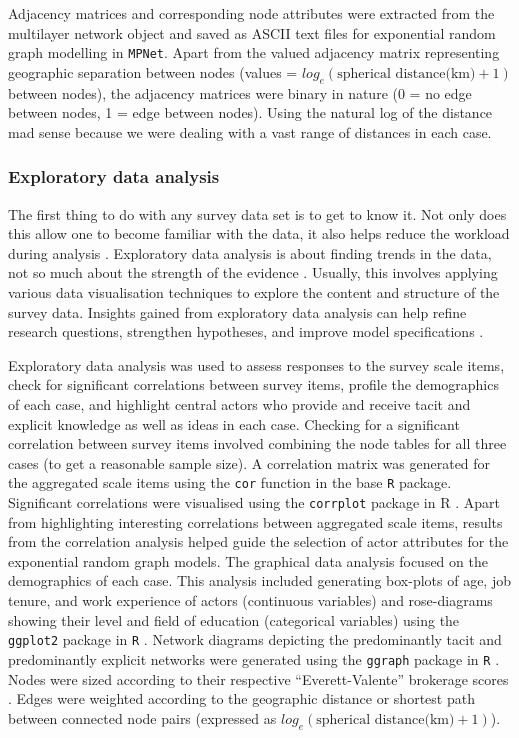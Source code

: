 Adjacency matrices and corresponding node attributes were extracted from the multilayer network object and saved as ASCII text files for exponential random graph modelling in \texttt{MPNet}. Apart from the valued adjacency matrix representing geographic separation between nodes (values = $log_e(\text{spherical distance(km)} + 1)$ between nodes), the adjacency matrices were binary in nature (0 = no edge between nodes, 1 = edge between nodes). Using the natural log of the distance mad sense because we were dealing with a vast range of distances in each case. 

\subsubsection{Exploratory data analysis}

The first thing to do with any survey data set is to get to know it. Not only does this allow one to become familiar with the data, it also helps reduce the workload during analysis \citep{cox2017translating}. Exploratory data analysis is about finding trends in the data, not so much about the strength of the evidence \citep{morgenthaler2009exploratory}. Usually, this involves applying various data visualisation techniques to explore the content and structure of the survey data. Insights gained from exploratory data analysis can help refine research questions, strengthen hypotheses, and improve model specifications \citep{jebb2017exploratory}. \medskip

Exploratory data analysis was used to assess responses to the survey scale items, check for significant correlations between survey items, profile the demographics of each case, and highlight central actors who provide and receive tacit and explicit knowledge as well as ideas in each case. Checking for a significant correlation between survey items involved combining the node tables for all three cases (to get a reasonable sample size). A correlation matrix was generated for the aggregated scale items using the \texttt{cor} function in the base \texttt{R} package. Significant correlations were visualised using the \texttt{corrplot} package in R \citep{wei2017corrplot}. Apart from highlighting interesting correlations between aggregated scale items, results from the correlation analysis helped guide the selection of actor attributes for the exponential random graph models. The graphical data analysis focused on the demographics of each case. This analysis included generating box-plots of age, job tenure, and work experience of actors (continuous variables) and rose-diagrams showing their level and field of education (categorical variables) using the \texttt{ggplot2} package in \texttt{R} \citep{wickham2016ggplot2}. Network diagrams depicting the predominantly tacit and predominantly explicit networks were generated using the \texttt{ggraph} package in \texttt{R} \citep{pedersen2019ggraph}. Nodes were sized according to their respective \enquote{Everett-Valente} brokerage scores \citep[][see explanation of this score below]{everett2016bridging}. Edges were weighted according to the geographic distance or shortest path between connected node pairs (expressed as $log_e(\text{spherical distance(km)} + 1)$). 

